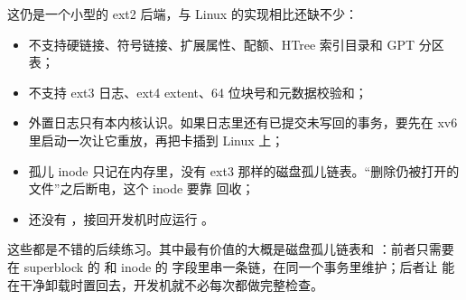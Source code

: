 这仍是一个小型的 ext2 后端，与 Linux 的实现相比还缺不少：

\begin{itemize}
  \item 不支持硬链接、符号链接、扩展属性、配额、HTree 索引目录和 GPT 分区表；
  \item 不支持 ext3 日志、ext4 extent、64 位块号和元数据校验和；
  \item 外置日志只有本内核认识。如果日志里还有已提交未写回的事务，要先在 xv6 里启动一次让它重放，再把卡插到 Linux 上；
  \item 孤儿 inode 只记在内存里，没有 ext3 那样的磁盘孤儿链表。“删除仍被打开的文件”之后断电，这个 inode 要靠  回收；
  \item 还没有 ，接回开发机时应运行 。
\end{itemize}

这些都是不错的后续练习。其中最有价值的大概是磁盘孤儿链表和 ：前者只需要在 superblock 的  和 inode 的  字段里串一条链，在同一个事务里维护；后者让  能在干净卸载时置回去，开发机就不必每次都做完整检查。
